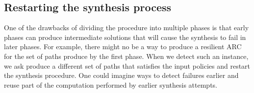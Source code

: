 \subsection{Restarting the synthesis process} \label{sec:restart}
One of the drawbacks of dividing the procedure into multiple phases is that
early phases can produce intermediate solutions that will cause the synthesis to fail in  later phases. 
For example, there might no be a way to produce a resilient ARC for  the set of paths produce by the first phase. 
When we detect such an instance, we ask produce a different set of paths that satisfies the input policies
and restart the synthesis procedure.
One could imagine ways to detect failures earlier and reuse part of the computation performed by earlier synthesis
attempts. %
